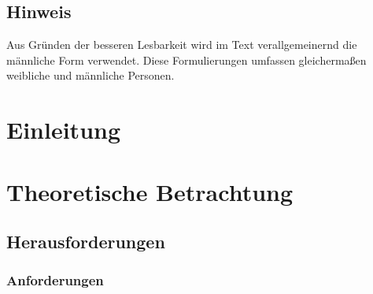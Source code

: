 \documentclass[
	12pt, %
	a4paper,
	bibliography=totoc, %
	numbers=noenddot, %
	ngerman, %
	headsepline, %
	oneside %
	]{scrbook} %
\newenvironment*{dontcount}{}{}
\begin{document}

\newpage

\tableofcontents{}

\listoffigures
{}

\begin{dontcount}
\section*{Hinweis}

Aus Gründen der besseren Lesbarkeit wird im Text verallgemeinernd die männliche Form verwendet.
Diese Formulierungen umfassen gleichermaßen weibliche und männliche Personen.
\clearpage

\end{dontcount}



\printnoidxglossary{}
\printacronyms{}

\clearpage



\chapter{Einleitung}\label{ch:einleitung}


\chapter{Theoretische Betrachtung}\label{ch:theroy}



\section{Herausforderungen}\label{sec:herausforderungen}


\subsection{Anforderungen}\label{subsec:anforderungen}

\end{document}
